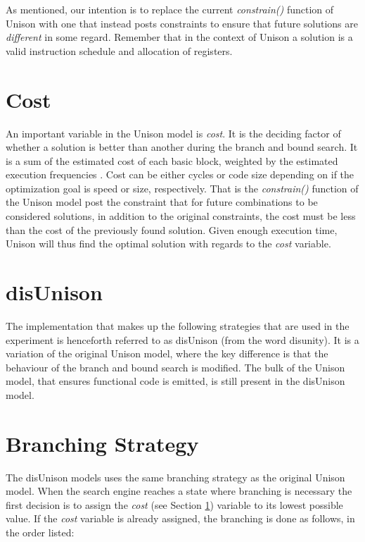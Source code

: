 As mentioned, our intention is to replace the current \textit{constrain()} function of
Unison with one that instead posts constraints to ensure that future solutions are
\textit{different} in some regard. Remember that in the context of Unison a solution is a
valid instruction schedule and allocation of registers.

\section{Cost}
\label{sec:cost}

An important variable in the Unison model is \textit{cost}. It is the deciding factor
of whether a solution is better than another during the branch and bound search. It is a
sum of the estimated cost of each basic block, weighted by the estimated execution
frequencies \cite{unison-docs}. Cost can be either cycles or code size depending on if the
optimization goal is speed or size, respectively. That is the \textit{constrain()} function
of the Unison model post the constraint that for future combinations to be considered
solutions, in addition to the original constraints, the cost must be less than the cost of
the previously found solution. Given enough execution time, Unison will thus find the
optimal solution with regards to the \textit{cost} variable.

\section{disUnison}
\label{sec:disUnison}

The implementation that makes up the following strategies that are used in the experiment
is henceforth referred to as disUnison (from the word disunity). It is a variation of the
original Unison model, where the key difference is that the behaviour of the branch and
bound search is modified. The bulk of the Unison model, that ensures functional code is
emitted, is still present in the disUnison model.



\section{Branching Strategy}
\label{sec:branch_strategy}

The disUnison models uses the same branching strategy as the original Unison model. When
the search engine reaches a state where branching is necessary the first decision is to
assign the \textit{cost} (see Section \ref{sec:cost}) variable to its lowest possible
value. If the \textit{cost} variable is already assigned, the branching is done as
follows, in the order listed:

